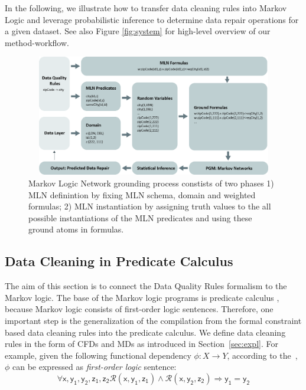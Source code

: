 In the following, we illustrate how to transfer data cleaning rules into Markov Logic and leverage probabilistic inference to determine data repair operations for a given dataset. See also Figure \ref{fig:system} for high-level overview of our method-workflow.

\begin{figure}[t]
 \centering
 \includegraphics[width=450px, height=200px]{img/mlogic-grounging.jpg}
 \caption{Markov Logic Network grounding process constists of two phases 1) MLN definintion by fixing MLN schema, domain and weighted formulas; 2) MLN instantiation by assigning truth values to the all possible instantiations of the MLN predicates and using these ground atoms in formulas.}
 \label{fig:mlngrounding}
\end{figure}

\subsection{Data Cleaning in Predicate Calculus}
\label{sec:ml}
The aim of this section is to connect the Data Quality Rules formalism to the Markov logic. The base of the Markov logic programs is predicate calculus \cite{genesereth1987logical}, because Markov logic consists of first-order logic sentences. Therefore, one important step is the generalization of the compilation from the formal constraint based data cleaning rules into the predicate calculus. %
We define data cleaning rules in the form of CFDs and MDs as introduced in Section~\ref{sec:expl}. For example, given the following functional dependency $\phi: X \rightarrow Y$, according to the~\cite{Fagin:1982:HCD:322344.322347}, $\phi$ can be expressed as \textit{first-order logic} sentence:
\begin{equation}
\mathsf{\forall x, y_1, y_2, z_1, z_2 \mathcal{R}(x, y_1, z_1) \wedge \mathcal{R}(x, y_2, z_2) \Rightarrow y_1=y_2}
\label{fd2fol}
\end{equation}

